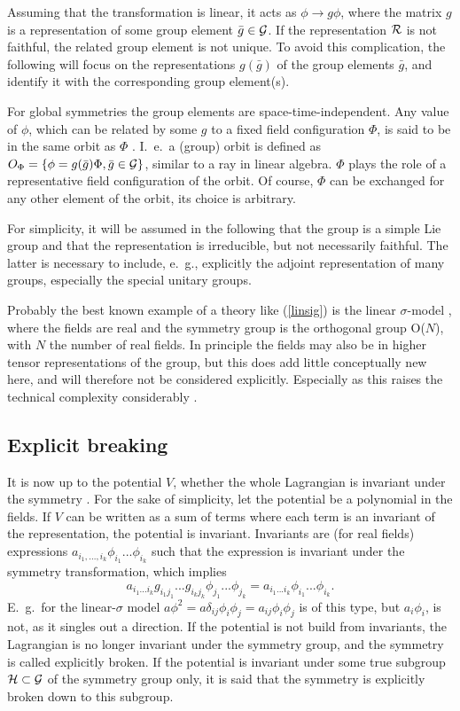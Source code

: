 \documentclass[final,twoside,12pt]{article}
\newcommand*{\no}{\noindent}
\newcommand*{\be}{\begin{equation}}
\newcommand*{\ee}{\end{equation}}
\newcommand*{\pref}[1]{(\ref{#1})}
\newcommand*{\nn}{\nonumber}
\newcommand*{\1}{1\!\!\!\bot}
\begin{document}
Assuming that the transformation is linear, it acts as $\phi\to g\phi$, where the matrix $g$ is a representation of some group element $\bar{g}\in{\cal G}$. If the representation ${\cal R}$ is not faithful, the related group element is not unique. To avoid this complication, the following will focus on the representations $g(\bar{g})$ of the group elements $\bar{g}$, and identify it with the corresponding group element(s).

For global symmetries the group elements are space-time-independent. Any value of $\phi$, which can be related by some $g$ to a fixed field configuration $\Phi$, is said to be in the same orbit as $\Phi$ \cite{O'Raifeartaigh:1978kv}. I.\ e.\ a (group) orbit is defined as $O_\Phi=\{\phi=g(\bar{g})\Phi,\bar{g}\in{\cal G}\}$, similar to a ray in linear algebra. $\Phi$ plays the role of a representative field configuration of the orbit. Of course, $\Phi$ can be exchanged for any other element of the orbit, its choice is arbitrary.

For simplicity, it will be assumed in the following that the group is a simple Lie group and that the representation is irreducible, but not necessarily faithful. The latter is necessary to include, e.\ g., explicitly the adjoint representation of many groups, especially the special unitary groups.

Probably the best known example of a theory like \pref{linsig} is the linear $\sigma$-model \cite{Bohm:2001yx}, where the fields are real and the symmetry group is the orthogonal group O($N$), with $N$ the number of real fields. In principle the fields may also be in higher tensor representations of the group, but this does add little conceptually new here, and will therefore not be considered explicitly. Especially as this raises the technical complexity considerably \cite{O'Raifeartaigh:1978kv}. 

\subsection{Explicit breaking}\label{ss:gsym}

It is now up to the potential $V$, whether the whole Lagrangian is invariant under the symmetry \cite{O'Raifeartaigh:1978kv,Sartori:1992ib}. For the sake of simplicity, let the potential be a polynomial in the fields. If $V$ can be written as a sum of terms where each term is an invariant of the representation, the potential is invariant. Invariants are (for real fields) expressions $a_{i_1,...,i_k}\phi_{i_1}...\phi_{i_k}$ such that the expression is invariant under the symmetry transformation, which implies
\be
a_{i_1...i_k}g_{i_1 j_1}...g_{i_kj_k}\phi_{j_1}...\phi_{j_k}=a_{i_1...i_k}\phi_{i_1}...\phi_{i_k}\nn.
\ee
\no E.\ g.\ for the linear-$\sigma$ model $a\phi^2=a\delta_{ij}\phi_i\phi_j=a_{ij}\phi_i\phi_j$ is of this type, but $a_i\phi_i$, is not, as it singles out a direction. If the potential is not build from invariants, the Lagrangian is no longer invariant under the symmetry group, and the symmetry is called explicitly broken. If the potential is invariant under some true subgroup ${\cal H}\subset{\cal G}$ of the symmetry group only, it is said that the symmetry is explicitly broken down to this subgroup.
\end{document}
